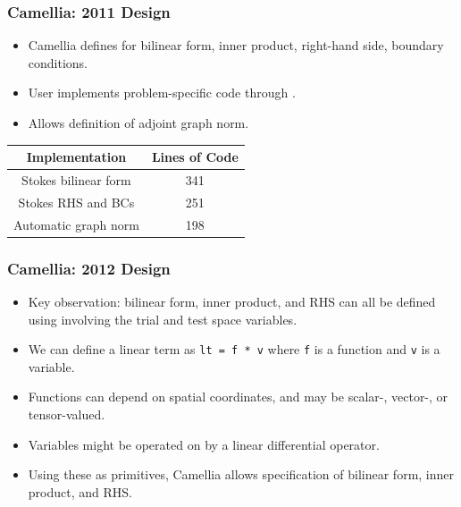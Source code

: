 \documentclass[mathserif]{beamer}
\newcommand{\code}[1]{\texttt{#1}}
\newcommand{\pecosbold}[1]{{\color{pecos2}{#1}}}
\begin{document}
\begin{frame}
\frametitle{Camellia: 2011 Design}
\begin{itemize}
\item Camellia defines \pecosbold{abstract classes} for bilinear form, inner product, right-hand side, boundary conditions.
\item User implements problem-specific code through \pecosbold{subclassing}.
\item Allows \pecosbold{automatic} definition of adjoint graph norm.
\end{itemize}

\begin{table}
\begin{center}
\begin{tabular}{| c | c |}
\hline
Implementation & Lines of Code\\
\hline
Stokes bilinear form & 341 \\
Stokes RHS and BCs & 251 \\
Automatic graph norm & 198 \\
\hline
\end{tabular}
\end{center}
\end{table}
\end{frame}

\begin{frame}
\frametitle{Camellia: 2012 Design}
\begin{itemize}
\item Key observation: bilinear form, inner product, and RHS can all be defined using \pecosbold{linear terms} involving the trial and test space variables.
\item We can define a linear term as \code{lt = f * v} where \code{f} is a function and \code{v} is a variable.
\item Functions can depend on spatial coordinates, and may be scalar-, vector-, or tensor-valued.
\item Variables might be operated on by a linear differential operator.
\item Using these as primitives, Camellia allows \pecosbold{declarative} specification of bilinear form, inner product, and RHS.
\end{itemize}
\end{frame}
\end{document}
